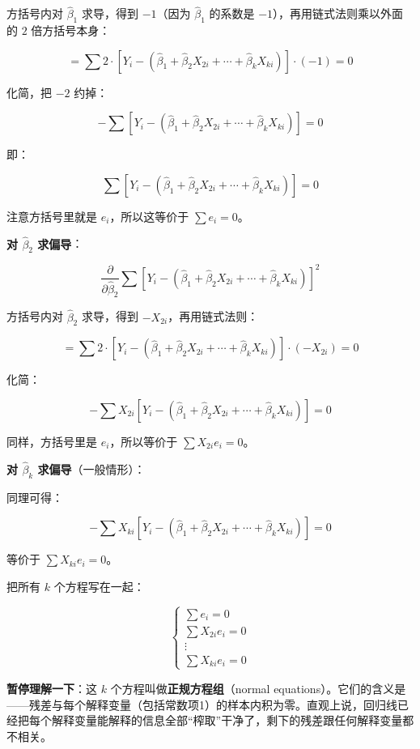 \documentclass[12pt,a4paper]{ctexart}
\begin{document}
方括号内对 $\hat{\beta}_1$ 求导，得到 $-1$（因为 $\hat{\beta}_1$ 的系数是 $-1$），再用链式法则乘以外面的 $2$ 倍方括号本身：

\[
= \sum 2 \cdot [Y_i - (\hat{\beta}_1 + \hat{\beta}_2 X_{2i} + \cdots + \hat{\beta}_k X_{ki})] \cdot (-1) = 0
\]

化简，把 $-2$ 约掉：

\[
-\sum [Y_i - (\hat{\beta}_1 + \hat{\beta}_2 X_{2i} + \cdots + \hat{\beta}_k X_{ki})] = 0
\]

即：

\[
\sum [Y_i - (\hat{\beta}_1 + \hat{\beta}_2 X_{2i} + \cdots + \hat{\beta}_k X_{ki})] = 0
\]

注意方括号里就是 $e_i$，所以这等价于 $\sum e_i = 0$。

\textbf{对 $\hat{\beta}_2$ 求偏导}：

\[
\frac{\partial}{\partial \hat{\beta}_2} \sum [Y_i - (\hat{\beta}_1 + \hat{\beta}_2 X_{2i} + \cdots + \hat{\beta}_k X_{ki})]^2
\]

方括号内对 $\hat{\beta}_2$ 求导，得到 $-X_{2i}$，再用链式法则：

\[
= \sum 2 \cdot [Y_i - (\hat{\beta}_1 + \hat{\beta}_2 X_{2i} + \cdots + \hat{\beta}_k X_{ki})] \cdot (-X_{2i}) = 0
\]

化简：

\[
-\sum X_{2i} [Y_i - (\hat{\beta}_1 + \hat{\beta}_2 X_{2i} + \cdots + \hat{\beta}_k X_{ki})] = 0
\]

同样，方括号里是 $e_i$，所以等价于 $\sum X_{2i} e_i = 0$。

\textbf{对 $\hat{\beta}_k$ 求偏导}（一般情形）：

同理可得：

\[
-\sum X_{ki} [Y_i - (\hat{\beta}_1 + \hat{\beta}_2 X_{2i} + \cdots + \hat{\beta}_k X_{ki})] = 0
\]

等价于 $\sum X_{ki} e_i = 0$。

把所有 $k$ 个方程写在一起：

\[
\begin{cases}
\sum e_i = 0 \\
\sum X_{2i} e_i = 0 \\
\vdots \\
\sum X_{ki} e_i = 0
\end{cases}
\]

\textbf{暂停理解一下}：这 $k$ 个方程叫做\textbf{正规方程组}（normal equations）。它们的含义是——残差与每个解释变量（包括常数项1）的样本内积为零。直观上说，回归线已经把每个解释变量能解释的信息全部“榨取”干净了，剩下的残差跟任何解释变量都不相关。
\end{document}
